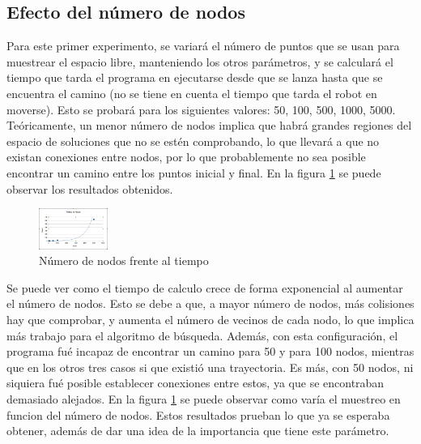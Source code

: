 \subsection{Efecto del número de nodos}

Para este primer experimento, se variará el número de puntos que se usan para muestrear el espacio libre, manteniendo los otros parámetros, y se calculará el tiempo que tarda el programa en ejecutarse desde que se lanza hasta que se encuentra el camino (no se tiene en cuenta el tiempo que tarda el robot en moverse). Esto se probará para los siguientes valores: 50, 100, 500, 1000, 5000.\\

Teóricamente, un menor número de nodos implica que habrá grandes regiones del espacio de soluciones que no se estén comprobando, lo que llevará a que no existan conexiones entre nodos, por lo que probablemente no sea posible encontrar un camino entre los puntos inicial y final.  En la figura \ref{fig:nodos_vs_t} se puede observar los resultados obtenidos.

\begin{figure}[H]
		\centering
        \includegraphics[width=0.2\textwidth]{images/t_vs_nodos.png}
        \caption{Número de nodos frente al tiempo}
        \label{fig:nodos_vs_t}
\end{figure} 

Se puede ver como el tiempo de calculo crece de forma exponencial al aumentar el número de nodos. Esto se debe a que, a mayor número de nodos, más colisiones hay que comprobar, y aumenta el número de vecinos de cada nodo, lo que implica más trabajo para el algoritmo de búsqueda. Además, con esta configuración, el programa fué incapaz de encontrar un camino para 50 y para 100 nodos, mientras que en los otros tres casos si que existió una trayectoria. Es más, con 50 nodos, ni siquiera fué posible establecer conexiones entre estos, ya que se encontraban demasiado alejados. En la figura \ref{fig:nodos_vs_t} se puede observar como varía el muestreo en funcion del número de nodos. Estos resultados prueban lo que ya se esperaba obtener, además de dar una idea de la importancia que tiene este parámetro.\\ 

